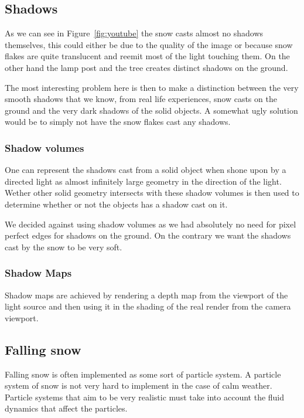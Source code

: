 \documentclass[a4paper,12pt]{article}
\begin{document}
\subsection{Shadows}

As we can see in Figure~\ref{fig:youtube} the snow casts almost no shadows themselves, this could either be due to the quality of the image or because snow flakes are quite translucent and reemit most of the light touching them. On the other hand the lamp post and the tree creates distinct shadows on the ground.

The most interesting problem here is then to make a distinction between the very smooth shadows that we know, from real life experiences, snow casts on the ground and the very dark shadows of the solid objects. A somewhat ugly solution would be to simply not have the snow flakes cast any shadows.


\subsubsection{Shadow volumes}

One can represent the shadows cast from a solid object when shone upon by a directed light as almost infinitely large geometry in the direction of the light. Wether other solid geometry intersects with these shadow volumes is then used to determine whether or not the objects has a shadow cast on it.

We decided against using shadow volumes as we had absolutely no need for pixel perfect edges for shadows on the ground. On the contrary we want the shadows cast by the snow to be very soft.


\subsubsection{Shadow Maps}

Shadow maps are achieved by rendering a depth map from the viewport of the light source and then using it in the shading of the real render from the camera viewport.


\subsection{Falling snow}

Falling snow is often implemented as some sort of particle system. A particle system of snow is not very hard to implement in the case of calm weather. Particle systems that aim to be very realistic must take into account the fluid dynamics that affect the particles. 
\end{document}
